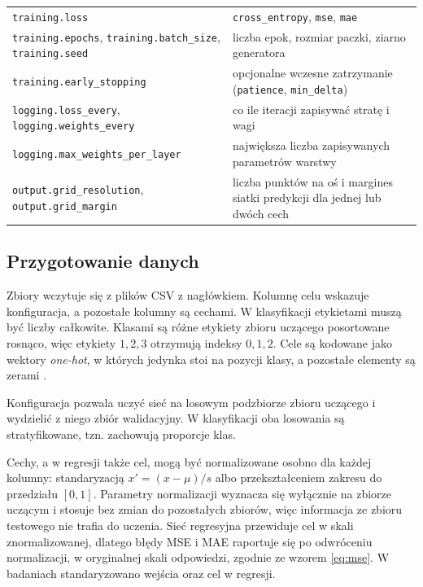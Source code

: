 \begin{table}[H]
\begin{tabularx}{\textwidth}{>{\raggedright\arraybackslash}p{}X}
        \texttt{training.loss} & \texttt{cross\_entropy}, \texttt{mse}, \texttt{mae} \\
        \texttt{training.epochs}, \texttt{training.batch\_size}, \texttt{training.seed} & liczba epok, rozmiar paczki, ziarno generatora \\
        \texttt{training.early\_stopping} & opcjonalne wczesne zatrzymanie (\texttt{patience}, \texttt{min\_delta}) \\
        \texttt{logging.loss\_every}, \texttt{logging.weights\_every} & co ile iteracji zapisywać stratę i wagi \\
        \texttt{logging.max\_weights\_per\_layer} & największa liczba zapisywanych parametrów warstwy \\
        \texttt{output.grid\_resolution}, \texttt{output.grid\_margin} & liczba punktów na oś i margines siatki predykcji dla jednej lub dwóch cech \\
        \bottomrule
    \end{tabularx}
\end{table}

\subsection{Przygotowanie danych}
\label{sec:implementation-data}

Zbiory wczytuje się z plików CSV z nagłówkiem. Kolumnę celu wskazuje konfiguracja, a pozostałe kolumny są cechami. W klasyfikacji etykietami muszą być liczby całkowite. Klasami są różne etykiety zbioru uczącego posortowane rosnąco, więc etykiety $1, 2, 3$ otrzymują indeksy $0, 1, 2$. Cele są kodowane jako wektory \textit{one-hot}, w których jedynka stoi na pozycji klasy, a pozostałe elementy są zerami \cite[rozdz.~4]{bishop2006}.

Konfiguracja pozwala uczyć sieć na losowym podzbiorze zbioru uczącego i wydzielić z niego zbiór walidacyjny. W klasyfikacji oba losowania są stratyfikowane, tzn. zachowują proporcje klas.

Cechy, a w regresji także cel, mogą być normalizowane osobno dla każdej kolumny: standaryzacją $x' = (x - \mu)/s$ albo przekształceniem zakresu do przedziału $[0, 1]$. Parametry normalizacji wyznacza się wyłącznie na zbiorze uczącym i stosuje bez zmian do pozostałych zbiorów, więc informacja ze zbioru testowego nie trafia do uczenia. Sieć regresyjna przewiduje cel w skali znormalizowanej, dlatego błędy MSE i MAE raportuje się po odwróceniu normalizacji, w oryginalnej skali odpowiedzi, zgodnie ze wzorem \eqref{eq:mse}. W badaniach standaryzowano wejścia oraz cel w regresji.

